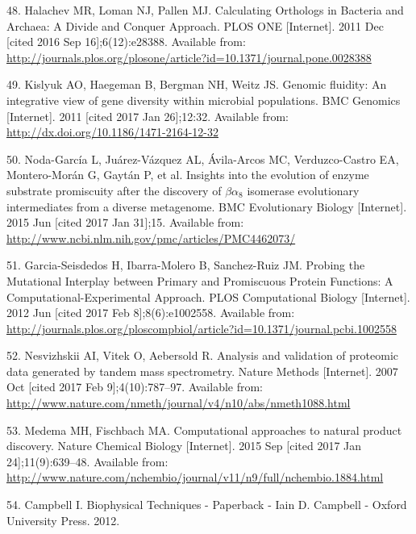\documentclass[12pt,twoside]{reedthesis}
\begin{document}
  \hypertarget{ref-halachev_calculating_2011}{}
  48. Halachev MR, Loman NJ, Pallen MJ. Calculating Orthologs in Bacteria
  and Archaea: A Divide and Conquer Approach. PLOS ONE {[}Internet{]}.
  2011 Dec {[}cited 2016 Sep 16{]};6(12):e28388. Available from:
  \url{http://journals.plos.org/plosone/article?id=10.1371/journal.pone.0028388}
  
  \hypertarget{ref-kislyuk_genomic_2011}{}
  49. Kislyuk AO, Haegeman B, Bergman NH, Weitz JS. Genomic fluidity: An
  integrative view of gene diversity within microbial populations. BMC
  Genomics {[}Internet{]}. 2011 {[}cited 2017 Jan 26{]};12:32. Available
  from: \url{http://dx.doi.org/10.1186/1471-2164-12-32}
  
  \hypertarget{ref-noda-garcia_insights_2015}{}
  50. Noda-García L, Juárez-Vázquez AL, Ávila-Arcos MC, Verduzco-Castro
  EA, Montero-Morán G, Gaytán P, et al. Insights into the evolution of
  enzyme substrate promiscuity after the discovery of \(\beta\alpha_8\)
  isomerase evolutionary intermediates from a diverse metagenome. BMC
  Evolutionary Biology {[}Internet{]}. 2015 Jun {[}cited 2017 Jan
  31{]};15. Available from:
  \url{http://www.ncbi.nlm.nih.gov/pmc/articles/PMC4462073/}
  
  \hypertarget{ref-garcia-seisdedos_probing_2012}{}
  51. Garcia-Seisdedos H, Ibarra-Molero B, Sanchez-Ruiz JM. Probing the
  Mutational Interplay between Primary and Promiscuous Protein Functions:
  A Computational-Experimental Approach. PLOS Computational Biology
  {[}Internet{]}. 2012 Jun {[}cited 2017 Feb 8{]};8(6):e1002558. Available
  from:
  \url{http://journals.plos.org/ploscompbiol/article?id=10.1371/journal.pcbi.1002558}
  
  \hypertarget{ref-nesvizhskii_analysis_2007}{}
  52. Nesvizhskii AI, Vitek O, Aebersold R. Analysis and validation of
  proteomic data generated by tandem mass spectrometry. Nature Methods
  {[}Internet{]}. 2007 Oct {[}cited 2017 Feb 9{]};4(10):787--97. Available
  from:
  \url{http://www.nature.com/nmeth/journal/v4/n10/abs/nmeth1088.html}
  
  \hypertarget{ref-medema_computational_2015}{}
  53. Medema MH, Fischbach MA. Computational approaches to natural product
  discovery. Nature Chemical Biology {[}Internet{]}. 2015 Sep {[}cited
  2017 Jan 24{]};11(9):639--48. Available from:
  \url{http://www.nature.com/nchembio/journal/v11/n9/full/nchembio.1884.html}
  
  \hypertarget{ref-campbell_biophysical_2012}{}
  54. Campbell I. Biophysical Techniques - Paperback - Iain D. Campbell -
  Oxford University Press. 2012.
  
\end{document}
